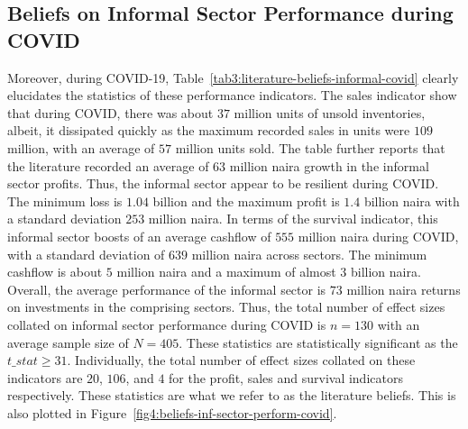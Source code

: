 \documentclass[12pt, english]{article}
\begin{document}
    \subsection{Beliefs on Informal Sector Performance during COVID}\label{subsec4.2:literature-beliefs-on-informal-sector-performance-during-covid-19}
    Moreover, during COVID-19, Table~\ref{tab3:literature-beliefs-informal-covid} clearly elucidates the statistics of these performance indicators. The sales indicator show that during COVID, there was about $37$ million units of unsold inventories, albeit, it dissipated quickly as the maximum recorded sales in units were $109$ million, with an average of $57$ million units sold. The table further reports that the literature recorded an average of $63$ million naira growth in the informal sector profits. Thus, the informal sector appear to be resilient during COVID. The minimum loss is $1.04$ billion and the maximum profit is $1.4$ billion naira with a standard deviation $253$ million naira. In terms of the survival indicator, this informal sector boosts of an average cashflow of $555$ million naira during COVID, with a standard deviation of $639$ million naira across sectors. The minimum cashflow is about $5$ million naira and a maximum of almost $3$ billion naira. Overall, the average performance of the informal sector is $73$ million naira returns on investments in the comprising sectors. Thus, the total number of effect sizes collated on informal sector performance during COVID is $n = 130$ with an average sample size of $N = 405$. These statistics are statistically significant as the $t\_stat \geq 31$. Individually, the total number of effect sizes collated on these indicators are $20$, $106$, and $4$ for the profit, sales and survival indicators respectively. These statistics are what we refer to as the literature beliefs. This is also plotted in Figure~\ref{fig4:beliefs-inf-sector-perform-covid}.
\end{document}
